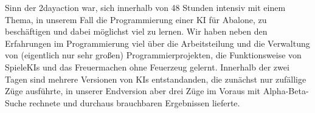Sinn der 2dayaction war, sich innerhalb von 48 Stunden intensiv mit einem Thema, in unserem 
Fall die Programmierung einer KI für Abalone, zu beschäftigen und dabei möglichst viel zu lernen.
Wir haben neben den Erfahrungen im Programmierung viel über die Arbeitsteilung und 
die Verwaltung von (eigentlich nur sehr großen) Programmierprojekten, die Funktionsweise von SpieleKIs und das Freuermachen
ohne Feuerzeug gelernt.
Innerhalb der zwei Tagen sind mehrere Versionen von KIs entstandanden, 
die zunächst nur zufällige Züge ausführte, in unserer Endversion aber drei Züge
im Voraus mit Alpha-Beta-Suche rechnete und durchaus brauchbaren Ergebnissen lieferte.
